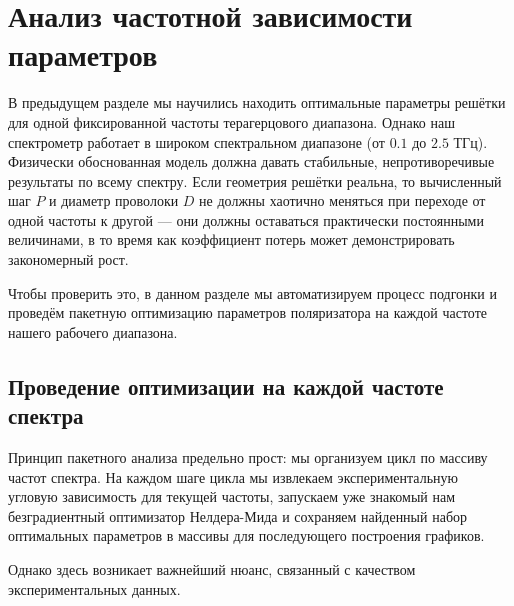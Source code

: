 
\section{Анализ частотной зависимости параметров}

В предыдущем разделе мы научились находить оптимальные параметры решётки для одной фиксированной частоты терагерцового диапазона. Однако наш спектрометр работает в широком спектральном диапазоне (от $0.1$ до $2.5$ ТГц). Физически обоснованная модель должна давать стабильные, непротиворечивые результаты по всему спектру. Если геометрия решётки реальна, то вычисленный шаг $P$ и диаметр проволоки $D$ не должны хаотично меняться при переходе от одной частоты к другой — они должны оставаться практически постоянными величинами, в то время как коэффициент потерь может демонстрировать закономерный рост.

Чтобы проверить это, в данном разделе мы автоматизируем процесс подгонки и проведём пакетную оптимизацию параметров поляризатора на каждой частоте нашего рабочего диапазона.

\subsection{Проведение оптимизации на каждой частоте спектра}

Принцип пакетного анализа предельно прост: мы организуем цикл по массиву частот спектра. На каждом шаге цикла мы извлекаем экспериментальную угловую зависимость для текущей частоты, запускаем уже знакомый нам безградиентный оптимизатор Нелдера-Мида и сохраняем найденный набор оптимальных параметров в массивы для последующего построения графиков.

Однако здесь возникает важнейший нюанс, связанный с качеством экспериментальных данных.



